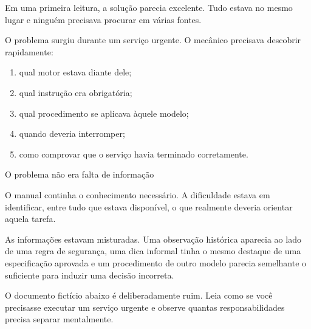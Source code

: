 \documentclass[
  10pt,
  a4paper,
  oneside]{book}
\providecommand{\tightlist}{%
  \setlength{\itemsep}{0pt}\setlength{\parskip}{0pt}}
\begin{document}
Em uma primeira leitura, a solução parecia excelente. Tudo estava no
mesmo lugar e ninguém precisava procurar em várias fontes.

O problema surgiu durante um serviço urgente. O mecânico precisava
descobrir rapidamente:

\begin{enumerate}
\def\labelenumi{\arabic{enumi}.}
\tightlist
\item
  qual motor estava diante dele;
\item
  qual instrução era obrigatória;
\item
  qual procedimento se aplicava àquele modelo;
\item
  quando deveria interromper;
\item
  como comprovar que o serviço havia terminado corretamente.
\end{enumerate}

\begin{tipbox}{O problema não era falta de informação}

O manual continha o conhecimento necessário. A dificuldade estava em
identificar, entre tudo que estava disponível, o que realmente deveria
orientar aquela tarefa.

\end{tipbox}

As informações estavam misturadas. Uma observação histórica aparecia ao
lado de uma regra de segurança, uma dica informal tinha o mesmo destaque
de uma especificação aprovada e um procedimento de outro modelo parecia
semelhante o suficiente para induzir uma decisão incorreta.

O documento fictício abaixo é deliberadamente ruim. Leia como se você
precisasse executar um serviço urgente e observe quantas
responsabilidades precisa separar mentalmente.
\end{document}
